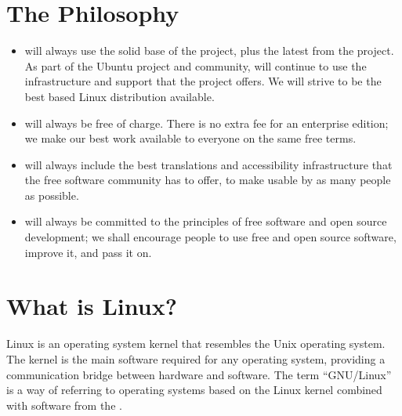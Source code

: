 \documentclass[letterpaper,10pt,english]{sphinxmanual}
\begin{document}
\section{The  Philosophy}
\label{\detokenize{welcome:the-kubuntu-philosophy}}\begin{itemize}
\item {} 
 will always use the solid base of the  project, plus the latest from the  project. As part of the Ubuntu project and community,  will continue to use the infrastructure and support that the  project offers. We will strive to be the best  based Linux distribution available.

\item {} 
 will always be free of charge. There is no extra fee for an enterprise edition; we make our best work available to everyone on the same free terms.

\item {} 
 will always include the best translations and accessibility infrastructure that the free software community has to offer, to make  usable by as many people as possible.

\item {} 
 will always be committed to the principles of free software and open source development; we shall encourage people to use free and open source software, improve it, and pass it on.

\end{itemize}


\section{What is Linux?}
\label{\detokenize{welcome:what-is-linux}}
Linux is an operating system kernel that resembles the Unix operating system. The kernel is the main software required for any operating system, providing a communication bridge between hardware and software. The term “GNU/Linux” is a way of referring to operating systems based on the Linux kernel combined with software from the .
\end{document}
